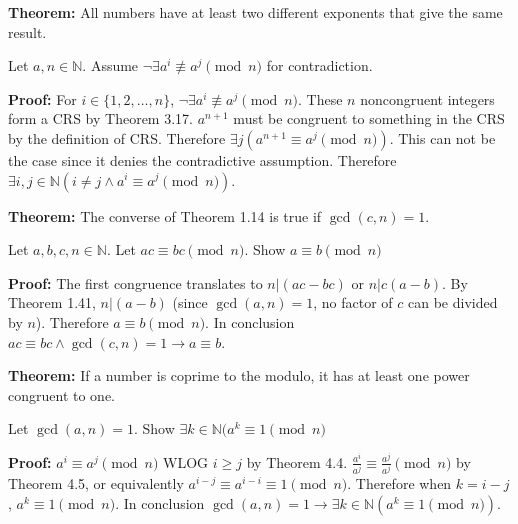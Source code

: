 \item \textbf{Theorem:} All numbers have at least two different exponents that give the same result.

Let \(a, n \in \mathbb N\). Assume \(\neg \exists a^i \not\equiv a^j \pmod n\) for contradiction.

\textbf{Proof:} For \(i \in \{1, 2, \dots, n\}\), \(\neg \exists a^i \not\equiv a^j \pmod n\). These \(n\) noncongruent integers form a CRS by Theorem 3.17. \(a^{n+1}\) must be congruent to something in the CRS by the definition of CRS. Therefore \(\exists j (a^{n+1} \equiv a^j \pmod n)\). This can not be the case since it denies the contradictive assumption. Therefore \(\exists i, j \in \mathbb N (i \neq j \wedge a^i \equiv a^j \pmod n)\). \qedhere

\item \textbf{Theorem:} The converse of Theorem 1.14 is true if \(\gcd(c, n) = 1\).

Let \(a, b, c, n \in \mathbb N\). Let \(ac \equiv bc \pmod n\). Show \(a \equiv b \pmod n\)

\textbf{Proof:} The first congruence translates to \(n | (ac-bc)\) or \(n | c(a-b)\). By Theorem 1.41, \(n | (a-b)\) (since \(\gcd(a, n) = 1\), no factor of \(c\) can be divided by \(n\)). Therefore \(a \equiv b \pmod n\). In conclusion \(ac \equiv bc \wedge \gcd(c, n) = 1 \rightarrow a \equiv b\). \qedhere

\item \textbf{Theorem:} If a number is coprime to the modulo, it has at least one power congruent to one.

Let \(\gcd(a, n) = 1\). Show \(\exists k \in \mathbb N (a^k \equiv 1 \pmod n\)

\textbf{Proof:} \(a^i \equiv a^j \pmod n\) WLOG \(i \geq j\) by Theorem
 4.4. \(\frac{a^i}{a^j} \equiv \frac{a^j}{a^j} \pmod n\) by Theorem 4.5, or equivalently \(a^{i-j} \equiv a^{i-i} \equiv 1 \pmod n\). Therefore when \(k = i - j\), \(a^k \equiv 1 \pmod n\). In conclusion \(\gcd(a, n) = 1 \rightarrow \exists k \in \mathbb N (a^k \equiv 1 \pmod n)\). \qedhere

\item 

